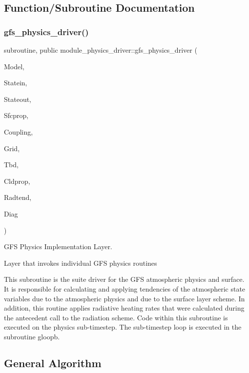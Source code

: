 \subsection{Function/\+Subroutine Documentation}
\mbox{\label{namespacemodule__physics__driver_a13c7ad66034ebcbe6f77208d83ac54da}} 
\subsubsection{gfs\+\_\+physics\+\_\+driver()}
{\footnotesize\ttfamily subroutine, public module\+\_\+physics\+\_\+driver\+::gfs\+\_\+physics\+\_\+driver (\begin{DoxyParamCaption}\item[{type(gfs\+\_\+control\+\_\+type), intent(in)}]{Model,  }\item[{type(gfs\+\_\+statein\+\_\+type), intent(inout)}]{Statein,  }\item[{type(gfs\+\_\+stateout\+\_\+type), intent(inout)}]{Stateout,  }\item[{type(gfs\+\_\+sfcprop\+\_\+type), intent(inout)}]{Sfcprop,  }\item[{type(gfs\+\_\+coupling\+\_\+type), intent(inout)}]{Coupling,  }\item[{type(gfs\+\_\+grid\+\_\+type), intent(in)}]{Grid,  }\item[{type(gfs\+\_\+tbd\+\_\+type), intent(inout)}]{Tbd,  }\item[{type(gfs\+\_\+cldprop\+\_\+type), intent(inout)}]{Cldprop,  }\item[{type(gfs\+\_\+radtend\+\_\+type), intent(inout)}]{Radtend,  }\item[{type(gfs\+\_\+diag\+\_\+type), intent(inout)}]{Diag }\end{DoxyParamCaption})}



G\+FS Physics Implementation Layer. 

Layer that invokes individual G\+FS physics routines

This subroutine is the suite driver for the G\+FS atmospheric physics and surface. It is responsible for calculating and applying tendencies of the atmospheric state variables due to the atmospheric physics and due to the surface layer scheme. In addition, this routine applies radiative heating rates that were calculated during the antecedent call to the radiation scheme. Code within this subroutine is executed on the physics sub-\/timestep. The sub-\/timestep loop is executed in the subroutine gloopb.\subsection{General Algorithm}\label{namespacemodule__physics__driver_general}

